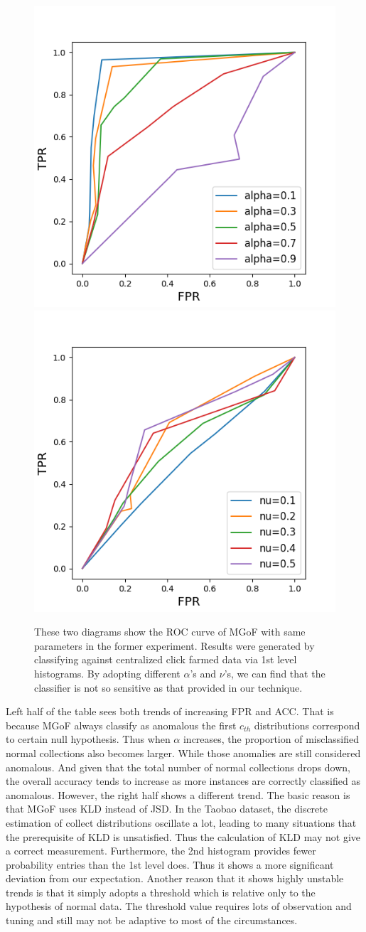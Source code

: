 \documentclass[10pt,conference,letterpaper]{IEEEtran}
\begin{document}
		\begin{figure}[!t]
			\centering
			\includegraphics[width=0.49\linewidth]{fig/ROC-Alpha-MGOF.png}
			\includegraphics[width=0.49\linewidth]{fig/ROC-Nu-MGOF.png}
			\caption{These two diagrams show the ROC curve of MGoF with same parameters in the former experiment. Results were generated by classifying against centralized click farmed data via 1st level histograms. By adopting different $\alpha$'s and $\nu$'s, we can find that the classifier is not so sensitive as that provided in our technique.}
			\label{fig:roc-mgof}
		\end{figure}
		
		Left half of the table sees both trends of increasing FPR and ACC. That is because MGoF always classify as anomalous the first $c_{th}$ distributions correspond to certain null hypothesis. Thus when $\alpha$ increases, the proportion of misclassified normal collections also becomes larger. While those anomalies are still considered anomalous. And given that the total number of normal collections drops down, the overall accuracy tends to increase as more instances are correctly classified as anomalous. However, the right half shows a different trend. The basic reason is that MGoF uses KLD instead of JSD. In the Taobao dataset, the discrete estimation of collect distributions oscillate a lot, leading to many situations that the prerequisite of KLD is unsatisfied. Thus the calculation of KLD may not give a correct measurement. Furthermore, the 2nd histogram provides fewer probability entries than the 1st level does. Thus it shows a more significant deviation from our expectation. Another reason that it shows highly unstable trends is that it simply adopts a threshold which is relative only to the hypothesis of normal data. The threshold value requires lots of observation and tuning and still may not be adaptive to most of the circumstances.
		
\end{document}
